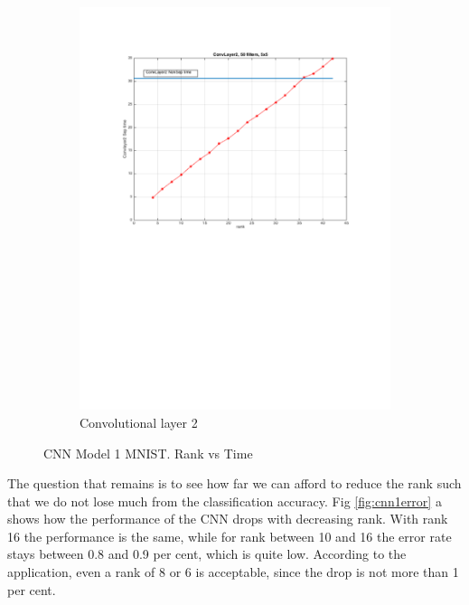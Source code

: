 \begin{figure}[h!]
\begin{subfigure}[b]{0.40\textwidth}
    \includegraphics[width=\textwidth]{images/imagesCNN_page3.pdf}
    \caption{Convolutional layer 2}
  \end{subfigure}
  \caption{CNN Model 1 MNIST. Rank vs Time}
  \label{fig:cnn1time}
\end{figure}

The question that remains is to see how far we can afford to reduce the rank such that we do not lose much from the classification accuracy. Fig \ref{fig:cnn1error} a shows how the performance of the CNN drops with decreasing rank. With rank 16 the performance is the same, while for rank between 10 and 16 the error rate stays between 0.8 and 0.9 per cent, which is quite low. According to the application, even a rank of 8 or 6 is acceptable, since the drop is not more than 1 per cent.

